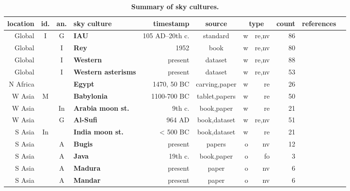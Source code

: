 \documentclass[10pt]{article}
\begin{document}
\begin{table}[htbp]
\centering
\caption{\footnotesize {\bf Summary of sky cultures.}}
%
\label{tab:culture_list}
%
%
{\footnotesize
%
{\renewcommand{\arraystretch}{0.94} %
%
\begin{tabular}{rcclrcrrrrr}
{\bf location}	&	{\bf id.} &	{\bf an.} & {\bf sky culture}	& {\bf timestamp}	& {\bf source}	& \multicolumn{2}{c}{{\bf type}}	& {\bf count}	& {\bf references} \\
\hline
%
Global		& I	& G	& \textbf{IAU}			& 105 AD--20th c.& standard		& w	& re,nv	& 86	& \cite{IAU,Stellarium} \\
Global		& 	& I	& \textbf{Rey}			& 1952			& book			& w	& re,nv	& 80	& \cite{rey1952stars,Stellarium} \\
Global		& 	& I	& \textbf{Western}	& present		& dataset		& w	& re,nv	& 88	& \cite{Stellarium} \\
Global		& 	& I	& \textbf{Western asterisms} & present	& dataset		& w	& re,nv	& 53	& \cite{Stellarium} \\
\hline
%
N Africa	& 	& 	& \textbf{Egypt}		& 1470, 50 BC 	& carving,paper & w	& re	& 26 	& \cite{lull2009constellations,Stellarium} \\
W Asia		& M	& 	& \textbf{Babylonia}& 1100-700 BC	& tablet,papers	& w	& re	& 50	& \cite{hoffmann2017hipparchs,hoffmann2017history,hoffmann2018drawing,Stellarium} \\
W Asia		& 	& In& \textbf{Arabia moon st.}	& 9th c.	& book,paper	& w	& re	& 21	& \cite{kunitzsch2013lunar,Stellarium} \\
W Asia		& 	& G	& \textbf{Al-Sufi}	& 964 AD		& book,dataset	& w	& re,nv	& 51	& \cite{Al_Sufi_Book,Stellarium} \\
S Asia		& In& 	& \textbf{India moon st.}	& < 500 BC	& book,dataset	& w	& re	& 21	& \cite{basham1954wonder,Stellarium} \\
S Asia		& 	& A	& \textbf{Bugis}		& present		& papers		& o	& nv	& 12	& \cite{orchiston2021mandar,orchiston2021seasia} \\
S Asia		& 	& A	& \textbf{Java}			& 19th c.		& book,paper	& o	& fo	& 3		& \cite{van1885astronomie,khairuddin2021austronesian} \\
S Asia		& 	& A	& \textbf{Madura}		& present		& paper			& o	& nv	& 6		& \cite{fatima2021madura} \\
S Asia		& 	& A	& \textbf{Mandar}		& present		& paper			& o	& nv	& 6		& \cite{orchiston2021mandar} \\

\end{tabular}}}
\end{table}
\end{document}
